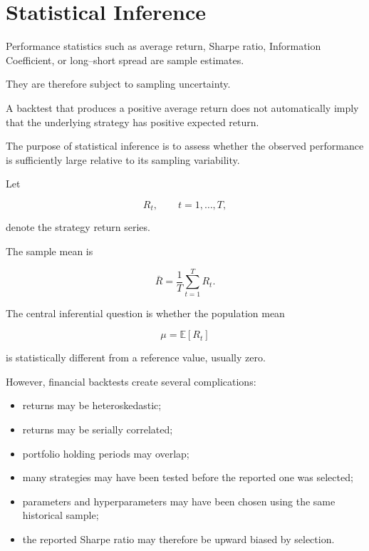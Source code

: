 \documentclass[11pt,a4paper]{article}
\begin{document}
\section{Statistical Inference}
\label{sec:statistical_inference}

Performance statistics such as average return, Sharpe ratio, Information
Coefficient, or long--short spread are sample estimates.

They are therefore subject to sampling uncertainty.

A backtest that produces a positive average return does not automatically imply
that the underlying strategy has positive expected return.

The purpose of statistical inference is to assess whether the observed
performance is sufficiently large relative to its sampling variability.

Let

\begin{equation}
R_t,
\qquad
t=1,\ldots,T,
\end{equation}

denote the strategy return series.

The sample mean is

\begin{equation}
\bar{R}
=
\frac{1}{T}
\sum_{t=1}^{T}
R_t.
\end{equation}

The central inferential question is whether the population mean

\begin{equation}
\mu
=
\mathbb{E}[R_t]
\end{equation}

is statistically different from a reference value, usually zero.

However, financial backtests create several complications:

\begin{itemize}
    \item returns may be heteroskedastic;
    \item returns may be serially correlated;
    \item portfolio holding periods may overlap;
    \item many strategies may have been tested before the reported one was
    selected;
    \item parameters and hyperparameters may have been chosen using the same
    historical sample;
    \item the reported Sharpe ratio may therefore be upward biased by selection.
\end{itemize}
\end{document}
